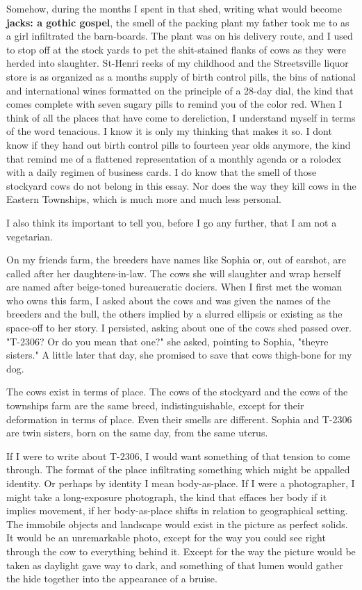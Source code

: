 Somehow, during the months I spent in that shed, writing what would
become \textbf{jacks: a gothic gospel}, the smell of the packing plant
my father took me to as a girl infiltrated the barn-boards. The plant
was on his delivery route, and I used to stop off at the stock yards to
pet the shit-stained flanks of cows as they were herded into slaughter.
St-Henri reeks of my childhood and the Streetsville liquor store is as
organized as a months supply of birth control pills, the bins of
national and international wines formatted on the principle of a 28-day
dial, the kind that comes complete with seven sugary pills to remind you
of the color red. When I think of all the places that have come to
dereliction, I understand myself in terms of the word tenacious. I know
it is only my thinking that makes it so. I dont know if they hand out
birth control pills to fourteen year olds anymore, the kind that remind
me of a flattened representation of a monthly agenda or a rolodex with a
daily regimen of business cards. I do know that the smell of those
stockyard cows do not belong in this essay. Nor does the way they kill
cows in the Eastern Townships, which is much more and much less
personal.

I also think its important to tell you, before I go any further, that I
am not a vegetarian.

On my friends farm, the breeders have names like Sophia or, out of
earshot, are called after her daughters-in-law. The cows she will
slaughter and wrap herself are named after beige-toned bureaucratic
dociers. When I first met the woman who owns this farm, I asked about
the cows and was given the names of the breeders and the bull, the
others implied by a slurred ellipsis or existing as the space-off to her
story. I persisted, asking about one of the cows shed passed over.
"T-2306? Or do you mean that one?" she asked, pointing to Sophia,
"theyre sisters." A little later that day, she promised to save that
cows thigh-bone for my dog.

The cows exist in terms of place. The cows of the stockyard and the cows
of the townships farm are the same breed, indistinguishable, except for
their deformation in terms of place. Even their smells are different.
Sophia and T-2306 are twin sisters, born on the same day, from the same
uterus.

If I were to write about T-2306, I would want something of that tension
to come through. The format of the place infiltrating something which
might be appalled identity. Or perhaps by identity I mean body-as-place.
If I were a photographer, I might take a long-exposure photograph, the
kind that effaces her body if it implies movement, if her body-as-place
shifts in relation to geographical setting. The immobile objects and
landscape would exist in the picture as perfect solids. It would be an
unremarkable photo, except for the way you could see right through the
cow to everything behind it. Except for the way the picture would be
taken as daylight gave way to dark, and something of that lumen would
gather the hide together into the appearance of a bruise.

